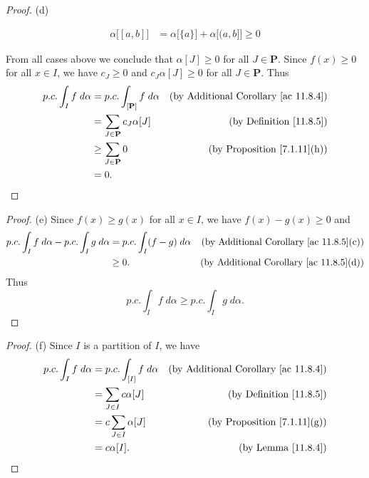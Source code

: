 \begin{proof}{(d)}
\begin{itemize}
\begin{align*}
                  \alpha\big[[a, b]\big] & = \alpha\big[\{a\}\big] + \alpha\big[(a, b]\big] \geq 0
              \end{align*}
    \end{itemize}
    From all cases above we conclude that \(\alpha[J] \geq 0\) for all \(J \in \mathbf{P}\).
    Since \(f(x) \geq 0\) for all \(x \in I\), we have \(c_J \geq 0\) and \(c_J \alpha[J] \geq 0\) for all \(J \in \mathbf{P}\).
    Thus
    \begin{align*}
        p.c. \int_I f \; d \alpha & = p.c. \int_{[\mathbf{P}]} f \; d \alpha & \text{(by Additional Corollary \ref{ac 11.8.4})} \\
                                  & = \sum_{J \in \mathbf{P}} c_J \alpha[J]  & \text{(by Definition \ref{11.8.5})}              \\
                                  & \geq \sum_{J \in \mathbf{P}} 0           & \text{(by Proposition \ref{7.1.11}(h))}          \\
                                  & = 0.
    \end{align*}
\end{proof}

\begin{proof}{(e)}
    Since \(f(x) \geq g(x)\) for all \(x \in I\), we have \(f(x) - g(x) \geq 0\) and
    \begin{align*}
        p.c. \int_I f \; d \alpha - p.c. \int_I g \; d \alpha & = p.c. \int_I (f - g) \; d \alpha & \text{(by Additional Corollary \ref{ac 11.8.5}(c))} \\
                                                              & \geq 0.                           & \text{(by Additional Corollary \ref{ac 11.8.5}(d))}
    \end{align*}
    Thus
    \[
        p.c. \int_I f \; d \alpha \geq p.c. \int_I g \; d \alpha.
    \]
\end{proof}

\begin{proof}{(f)}
    Since \(I\) is a partition of \(I\), we have
    \begin{align*}
        p.c. \int_I f \; d \alpha & = p.c. \int_{[I]} f \; d \alpha & \text{(by Additional Corollary \ref{ac 11.8.4})} \\
                                  & = \sum_{J \in I} c \alpha[J]    & \text{(by Definition \ref{11.8.5})}              \\
                                  & = c \sum_{J \in I} \alpha[J]    & \text{(by Proposition \ref{7.1.11}(g))}          \\
                                  & = c \alpha[I].                  & \text{(by Lemma \ref{11.8.4})}
    \end{align*}
\end{proof}

